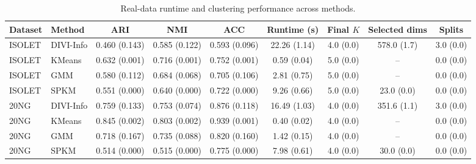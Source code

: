 \begin{table}[t]
\centering
\caption{Real-data runtime and clustering performance across methods.}
\label{tab:runtime-real-main}
\begin{tabular}{llccccccc}
\toprule
Dataset & Method & ARI & NMI & ACC & Runtime (s) & Final $K$ & Selected dims & Splits \\
\midrule
ISOLET & DIVI-Info & 0.460 (0.143) & 0.585 (0.122) & 0.593 (0.096) & 22.26 (1.14) & 4.0 (0.0) & 578.0 (1.7) & 3.0 (0.0) \\
ISOLET & KMeans & 0.632 (0.001) & 0.716 (0.001) & 0.752 (0.001) & 0.59 (0.04) & 5.0 (0.0) & -- & 0.0 (0.0) \\
ISOLET & GMM & 0.580 (0.112) & 0.684 (0.068) & 0.705 (0.106) & 2.81 (0.75) & 5.0 (0.0) & -- & 0.0 (0.0) \\
ISOLET & SPKM & 0.551 (0.000) & 0.640 (0.000) & 0.722 (0.000) & 9.26 (0.66) & 5.0 (0.0) & 23.0 (0.0) & 0.0 (0.0) \\
20NG & DIVI-Info & 0.759 (0.133) & 0.753 (0.074) & 0.876 (0.118) & 16.49 (1.03) & 4.0 (0.0) & 351.6 (1.1) & 3.0 (0.0) \\
20NG & KMeans & 0.845 (0.002) & 0.803 (0.002) & 0.939 (0.001) & 0.40 (0.02) & 4.0 (0.0) & -- & 0.0 (0.0) \\
20NG & GMM & 0.718 (0.167) & 0.735 (0.088) & 0.820 (0.160) & 1.42 (0.15) & 4.0 (0.0) & -- & 0.0 (0.0) \\
20NG & SPKM & 0.514 (0.000) & 0.515 (0.000) & 0.775 (0.000) & 7.98 (0.61) & 4.0 (0.0) & 30.0 (0.0) & 0.0 (0.0) \\
\bottomrule
\end{tabular}
\end{table}
